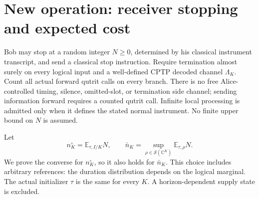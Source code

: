 \documentclass[11pt]{article}
\newcommand{\E}{\mathbb E}
\begin{document}
\section{New operation: receiver stopping and expected cost}\label{sec:stopping}

Bob may stop at a random integer $N\ge0$, determined by his classical instrument transcript, and send a classical stop instruction. Require termination almost surely on every logical input and a well-defined CPTP decoded channel $\Lambda_K$. Count all actual forward qutrit calls on every branch. There is no free Alice-controlled timing, silence, omitted-slot, or termination side channel; sending information forward requires a counted qutrit call. Infinite local processing is admitted only when it defines the stated normal instrument. No finite upper bound on $N$ is assumed.

Let
\begin{equation}
 n_K^\circ=\E_{\tau,I/K}N,\qquad
 \bar n_K=\sup_{\rho\in\mathcal S(\mathbb C^K)}\E_{\tau,\rho}N.\label{eq:costs}
\end{equation}
We prove the converse for $n_K^\circ$, so it also holds for $\bar n_K$. This choice includes arbitrary references: the duration distribution depends on the logical marginal. The actual initializer $\tau$ is the same for every $K$. A horizon-dependent supply state is excluded.
\end{document}
